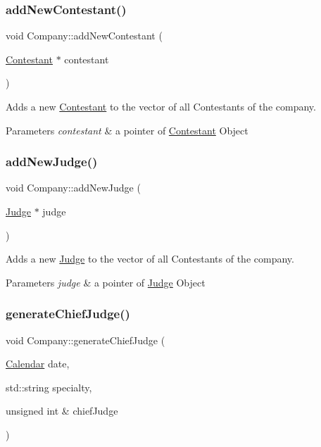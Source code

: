 \subsubsection{\texorpdfstring{add\+New\+Contestant()}{addNewContestant()}}
{\footnotesize\ttfamily void Company\+::add\+New\+Contestant (\begin{DoxyParamCaption}\item[{\hyperlink{class_contestant}{Contestant} $\ast$}]{contestant }\end{DoxyParamCaption})}



Adds a new \hyperlink{class_contestant}{Contestant} to the vector of all Contestants of the company. 


\begin{DoxyParams}{Parameters}
{\em contestant} & a pointer of \hyperlink{class_contestant}{Contestant} Object \\
\hline
\end{DoxyParams}
\mbox{\label{class_company_a0103d856876e3cb9188d1bf71903baff}} 
\subsubsection{\texorpdfstring{add\+New\+Judge()}{addNewJudge()}}
{\footnotesize\ttfamily void Company\+::add\+New\+Judge (\begin{DoxyParamCaption}\item[{\hyperlink{class_judge}{Judge} $\ast$}]{judge }\end{DoxyParamCaption})}



Adds a new \hyperlink{class_judge}{Judge} to the vector of all Contestants of the company. 


\begin{DoxyParams}{Parameters}
{\em judge} & a pointer of \hyperlink{class_judge}{Judge} Object \\
\hline
\end{DoxyParams}
\mbox{\label{class_company_af5121e8ac79b845e06a1c592f9db41d3}} 
\subsubsection{\texorpdfstring{generate\+Chief\+Judge()}{generateChiefJudge()}}
{\footnotesize\ttfamily void Company\+::generate\+Chief\+Judge (\begin{DoxyParamCaption}\item[{\hyperlink{class_calendar}{Calendar}}]{date,  }\item[{std\+::string}]{specialty,  }\item[{unsigned int \&}]{chief\+Judge }\end{DoxyParamCaption})}



